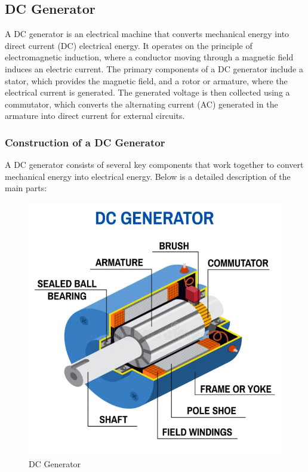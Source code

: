 \documentclass[a4paper,12pt]{article}
\begin{document}
	
	\subsection{DC Generator}
	A DC generator is an electrical machine that converts mechanical energy into direct current (DC) electrical energy. It operates on the principle of electromagnetic induction, where a conductor moving through a magnetic field induces an electric current. The primary components of a DC generator include a stator, which provides the magnetic field, and a rotor or armature, where the electrical current is generated. The generated voltage is then collected using a commutator, which converts the alternating current (AC) generated in the armature into direct current for external circuits.\\
	
	\subsubsection[short title]{Construction of a DC Generator}
A DC generator consists of several key components that work together to convert mechanical energy into electrical energy. Below is a detailed description of the main parts:
\begin{figure}[h]
	\centering
	\includegraphics[width=0.5\linewidth]{"Images/DC Generator"}
	\caption[DC Generator]{DC Generator}
	\label{fig:dc-generator}
\end{figure}
\end{document}
